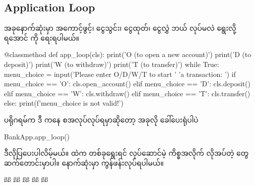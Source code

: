 \subsection*{Application Loop}
အခုနောက်ဆုံးမှာ အကောင့်ဖွင့်၊ ငွေသွင်း၊ ငွေထုတ်၊ ငွေလွှဲ ဘယ်  လုပ်မလဲ ရွေးလို့ရအောင်  ကို ရေးရပါမယ်။
%
\begin{py}
@classmethod
def app_loop(cls):
    print('O (to open a new account)')
    print('D (to deposit)')
    print('W (to withdraw)')
    print('T (to transfer)')
    while True:
        menu_choice = input('Please enter O/D/W/T to start '
                            'a transaction: ')
        if menu_choice == 'O':
            cls.open_account()
        elif menu_choice == 'D':
            cls.deposit()
        elif menu_choice == 'W':
            cls.withdraw()
        elif menu_choice == 'T':
            cls.transfer()
        else:
            print(f'{menu_choice} is not valid!')
\end{py}
%
ပရိုဂရမ်က ဒီ  ကနေ စအလုပ်လုပ်ရမှာဆိုတော့ အခုလို ခေါ်ပေးရုံပါပဲ
%
\begin{py}
BankApp.app_loop()
\end{py}
%
ဒီလိုပြပေးပါလိမ့်မယ်။  ထဲက တစ်ခုရွေးရင် လုပ်ဆောင်မဲ့ ကိစ္စအလိုက် လိုအပ်တဲ့  တွေ ဆက်တောင်းမှာပါ။ နောက်ဆုံးမှာ  ကွန်ဖန်းလုပ်ရပါမယ်။  
\begin{codetxt}
ßß
ßß
ßß
ßß
ßß 
\end{codetxt}

